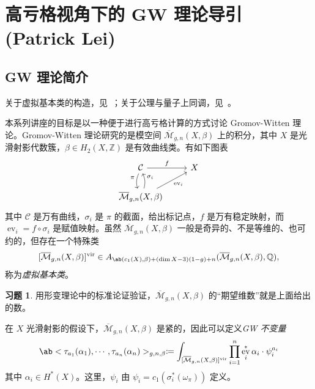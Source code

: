 \documentclass{amsart}
\theoremstyle{definition}
\newtheorem{exer}[thm]{习题}
\theoremstyle{remark}
\theoremstyle{plain}
\theoremstyle{definition}
\theoremstyle{remark}
\newcommand{\Z}{\mathbb{Z}}
\newcommand{\Q}{\mathbb{Q}}
\newcommand{\Mbar}{\overline{\mathcal{M}}}
\newcommand{\mc}[1]{\mathcal{#1}}
\newcommand{\mr}[1]{\mathrm{#1}}
\newcommand{\on}[1]{\operatorname{#1}}
\newcommand{\1}{\mathbf{1}}
\newcommand{\2}{\mathbf{2}}
\newcommand{\3}{\mathbf{3}}
\newcommand{\vir}{\mr{vir}}
\DeclareMathOperator{\ev}{ev}
\begin{document}
\section{高亏格视角下的 GW 理论导引 (Patrick Lei)}%
\label{sec:Intro to GW theory with a view to higher genus (Patrick Lei)}


\subsection{GW 理论简介}%
\label{sub:Introduction to GW theory}

关于虚拟基本类的构造，见~\cite{BehrendFantechi1997}；关于公理与量子上同调，见~\cite{KM1994}。

本系列讲座的目标是以一种便于进行高亏格计算的方式讨论 Gromov-Witten 理论。Gromov-Witten 理论研究的是模空间 \(\Mbar_{g,n}(X, \beta)\) 上的积分，其中 \(X\) 是光滑射影代数簇，\(\beta \in H_2(X, \Z)\) 是有效曲线类。有如下图表
\begin{equation*}
\begin{tikzcd}
    \mc{C} \ar{r}{f} \ar[bend right=20]{d}[swap]{\pi} & X \\
    \Mbar_{g,n}(X, \beta) \ar[bend right=20]{u}[swap]{\sigma_i} \ar{ur}[swap]{\on{ev}_i}
\end{tikzcd}
\end{equation*}
其中 \(\mc{C}\) 是万有曲线，\(\sigma_i\) 是 \(\pi\) 的截面，给出标记点，\(f\) 是万有稳定映射，而 \(\ev_i = f \circ \sigma_i\) 是赋值映射。虽然 \(\Mbar_{g,n}(X, \beta)\) 一般是奇异的、不是等维的、也可约的，但存在一个特殊类
\[ [\Mbar_{g,n}(X, \beta)]^{\vir} \in A_{\ab(c_1(X), \beta) + (\dim X - 3)(1-g) + n}(\Mbar_{g,n}(X, \beta), \Q), \]
称为\textit{虚拟基本类}。

\begin{exer}
    用形变理论中的标准论证验证，\(\Mbar_{g,n}(X, \beta)\) 的“期望维数”就是上面给出的数。
\end{exer}

在 \(X\) 光滑射影的假设下，\(\Mbar_{g,n}(X, \beta)\) 是紧的，因此可以定义\textit{GW 不变量}
\[ \ab<\tau_{a_1}(\alpha_1), \cdots, \tau_{a_n}(\alpha_n)>_{g,n,\beta} \coloneqq \int_{[\Mbar_{g,n}(X, \beta)]^{\vir}} \prod_{i=1}^n \ev_i^* \alpha_i \cdot \psi_i^{a_i} \]
其中 \(\alpha_i \in H^*(X)\)。这里，\(\psi_i\) 由 \(\psi_i = c_1(\sigma_i^*(\omega_{\pi}))\) 定义。
\end{document}
